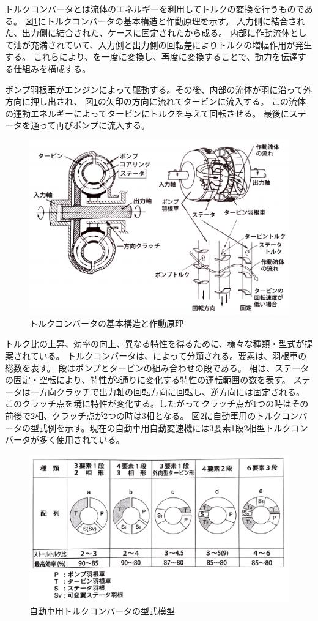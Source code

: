 トルクコンバータとは流体のエネルギーを利用してトルクの変換を行うものである。
図\ref{im1}にトルクコンバータの基本構造と作動原理を示す。
入力側に結合された\textbf{}、出力側に結合された\textbf{}、ケースに固定された\textbf{}から成る。
内部に作動流体として油が充満されていて、入力側と出力側の回転差によりトルクの増幅作用が発生する。
これらにより、\textbf{}を一度\textbf{}に変換し、再度\textbf{}に変換することで、動力を伝達する仕組みを構成する。

ポンプ羽根車がエンジンによって駆動する。その後、内部の流体が羽に沿って外方向に押し出され、
図\ref{im1}の矢印の方向に流れてタービンに流入する。
この流体の運動エネルギーによってタービンにトルクを与えて回転させる。
最後にステータを通って再びポンプに流入する。

\begin{figure}[H]
  \begin{center}
  \includegraphics[width=.38\columnwidth]{img/1_en2_1.pdf}
  \caption{トルクコンバータの基本構造と作動原理}
  \label{im1}
  \end{center}
\end{figure}

トルク比の上昇、効率の向上、異なる特性を得るために、様々な種類・型式が提案されている。
トルクコンバータは、\textbf{}によって分類される。要素は、羽根車の総数を表す。
段はポンプとタービンの組み合わせの段である。
相は、ステータの固定・空転により、特性が2通りに変化する特性の運転範囲の数を表す。
ステータは一方向クラッチで出力軸の回転方向に回転し、逆方向には固定される。
このクラッチ点を境に特性が変化する。したがってクラッチ点が1つの時はその前後で2相、クラッチ点が2つの時は3相となる。
図\ref{im2}に自動車用のトルクコンバータの型式例を示す。現在の自動車用自動変速機には3要素1段2相型トルクコンバータが多く使用されている。

\begin{figure}[H]
  \begin{center}
  \includegraphics[width=.4\columnwidth]{img/3_en2_1.pdf}
  \caption{自動車用トルクコンバータの型式模型}
  \label{im2}
  \end{center}
\end{figure}

